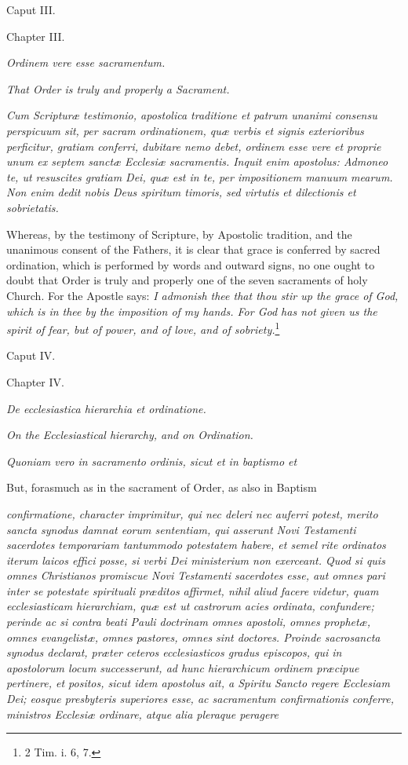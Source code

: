 Caput III.

Chapter III.

\emph{Ordinem vere esse sacramentum.}

\emph{That Order is truly and properly a Sacrament.}

\emph{Cum Scripturæ testimonio, apostolica traditione et patrum unanimi consensu perspicuum sit, per sacram ordinationem, quæ verbis et signis exterioribus perficitur, gratiam conferri, dubitare nemo debet, ordinem esse vere et proprie unum ex septem sanctæ Ecclesiæ sacramentis. Inquit enim apostolus: Admoneo te, ut resuscites gratiam Dei, quæ est in te, per impositionem manuum mearum. Non enim dedit nobis Deus spiritum timoris, sed virtutis et dilectionis et sobrietatis.}

Whereas, by the testimony of Scripture, by Apostolic tradition, and the unanimous consent of the Fathers, it is clear that grace is conferred by sacred ordination, which is performed by words and outward signs, no one ought to doubt that Order is truly and properly one of the seven sacraments of holy Church. For the Apostle says: \emph{I admonish thee that thou stir up the grace of God, which is in thee by the imposition of my hands. For God has not given us the spirit of fear, but of power, and of love, and of sobriety.}\footnote{\par   2 Tim. i. 6, 7.}

Caput IV.

Chapter IV.

\emph{De ecclesiastica hierarchia et ordinatione.}

\emph{On the Ecclesiastical hierarchy, and on Ordination.}

\emph{Quoniam vero in sacramento ordinis, sicut et in baptismo et }

But, forasmuch as in the sacrament of Order, as also in Baptism

\emph{confirmatione, character imprimitur, qui nec deleri nec auferri potest, merito sancta synodus damnat eorum sententiam, qui asserunt Novi Testamenti sacerdotes temporariam tantummodo potestatem habere, et semel rite ordinatos iterum laicos effici posse, si verbi Dei ministerium non exerceant. Quod si quis omnes Christianos promiscue Novi Testamenti sacerdotes esse, aut omnes pari inter se potestate spirituali præditos affirmet, nihil aliud facere videtur, quam ecclesiasticam hierarchiam, quæ est ut castrorum acies ordinata, confundere; perinde ac si contra beati Pauli doctrinam omnes apostoli, omnes prophetæ, omnes evangelistæ, omnes pastores, omnes sint doctores. Proinde sacrosancta synodus declarat, præter ceteros ecclesiasticos gradus episcopos, qui in apostolorum locum successerunt, ad hunc hierarchicum ordinem præcipue pertinere, et positos, sicut idem apostolus ait, a Spiritu Sancto regere Ecclesiam Dei; eosque presbyteris superiores esse, ac sacramentum confirmationis conferre, ministros Ecclesiæ ordinare, atque alia pleraque peragere }

